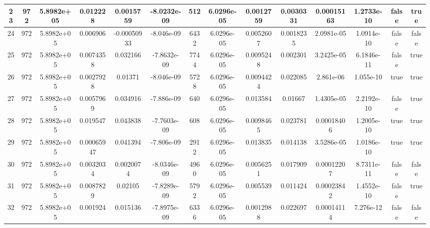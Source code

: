 \documentclass[a4paper, 14pt]{article}
\begin{document}
\begin{landscape}
\begin{longtable}{|c|c|c|c|c|c|c|c|c|c|c|c|c|c|}
    \hline
    23   &   972   &  5.8982e+05  &    0.012228   &   0.0015759  &  -8.0232e-09  &   512   &  6.0296e-05  &  0.0012759  &  0.0030331  &  0.00015163   & 1.2733e-10  &  false     &  true   \\
    \hline
    24   &   972   &  5.8982e+05  &    0.006906   & -0.00050933  &   -8.046e-09  &  6432   &  6.0296e-05  &  0.0052607  &  0.0018235  &  2.0981e-05   & 1.0914e-10  &  false     &  false  \\
    \hline
    25   &   972   &  5.8982e+05  &   0.0074358   &    0.032166  &  -7.8632e-09  &  7744   &  6.0296e-05  &  0.0095248  &   0.002301  &  3.2425e-05   & 6.1846e-11  &  false     &  true   \\
    \hline
    26   &   972   &  5.8982e+05  &   0.0027928   &     0.01371  &   -8.046e-09  &  5728   &  6.0296e-05  &  0.0094424  &   0.022085  &   2.861e-06   &  1.055e-10  &  true      &  true   \\
    \hline
    27   &   972   &  5.8982e+05  &   0.0057969   &    0.034916  &   -7.886e-09  &   640   &  6.0296e-05  &   0.013584  &    0.01667  &  1.4305e-05   & 2.2192e-10  &  false     &  true   \\
    \hline
    28   &   972   &  5.8982e+05  &    0.019547   &    0.043838  &  -7.7603e-09  &   608   &  6.0296e-05  &  0.0098465  &   0.023781  &  0.00018406   & 1.2005e-10  &  true      &  true   \\
    \hline
    29   &   972   &  5.8982e+05  &  0.00065947   &    0.041394  &   -7.806e-09  &  2912   &  6.0296e-05  &   0.013835  &   0.014138  &  3.5286e-05   & 1.0186e-10  &  true      &  true   \\
    \hline
    30   &   972   &  5.8982e+05  &   0.0032034   &   0.0020074  &  -8.0346e-09  &  4960   &  6.0296e-05  &  0.0056251  &   0.017909  &  0.00012207   & 8.7311e-11  &  false     &  false  \\
    \hline
    31   &   972   &  5.8982e+05  &   0.0087829   &     0.02105  &  -7.8289e-09  &  5792   &  6.0296e-05  &   0.005539  &   0.011424  &  0.00023842   & 1.4552e-10  &  false     &  true   \\
    \hline
    32   &   972   &  5.8982e+05  &    0.001924   &    0.015136  &  -7.8975e-09  &  6336   &  6.0296e-05  &  0.0012988  &   0.022697  &  0.00014114   &  7.276e-12  &  false     &  false  \\
    \hline

  \end{longtable}

\end{landscape}
\end{document}
